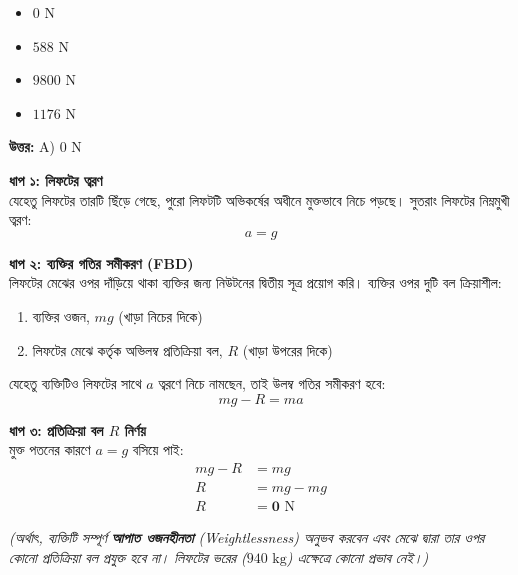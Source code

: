 \documentclass[12pt, a4paper]{article}
\begin{document}
\begin{itemize}[label={}, leftmargin=1cm, itemsep=0.5em]
    \item[\textbf{A)}]  $0\text{ N}$
    \item[\textbf{B)}] $588\text{ N}$
    \item[\textbf{C)}]  $9800\text{ N}$
    \item[\textbf{D)}] $1176\text{ N}$
\end{itemize}

\vspace{0.5em}
\begin{tcolorbox}[answerbox]
    \textbf{\color{success} উত্তর:} A)  $0\text{ N}$
\end{tcolorbox}
\vspace{1em}

\begin{tcolorbox}[solutionbox={সমাধান (Solution)}]
    \noindent
    \textbf{ধাপ ১: লিফটের ত্বরণ} \\
    যেহেতু লিফটের তারটি ছিঁড়ে গেছে, পুরো লিফটটি অভিকর্ষের অধীনে মুক্তভাবে নিচে পড়ছে। সুতরাং লিফটের নিম্নমুখী ত্বরণ:
    \[ a = g \]
    
    \vspace{0.5em}
    \noindent\textbf{ধাপ ২: ব্যক্তির গতির সমীকরণ (FBD)} \\
    লিফটের মেঝের ওপর দাঁড়িয়ে থাকা ব্যক্তির জন্য নিউটনের দ্বিতীয় সূত্র প্রয়োগ করি। ব্যক্তির ওপর দুটি বল ক্রিয়াশীল:
    \begin{enumerate}[topsep=0pt, itemsep=0pt]
        \item ব্যক্তির ওজন, $mg$ (খাড়া নিচের দিকে)
        \item লিফটের মেঝে কর্তৃক অভিলম্ব প্রতিক্রিয়া বল, $R$ (খাড়া উপরের দিকে)
    \end{enumerate}
    যেহেতু ব্যক্তিটিও লিফটের সাথে $a$ ত্বরণে নিচে নামছেন, তাই উলম্ব গতির সমীকরণ হবে:
    \[ mg - R = ma \]
    
    \vspace{0.5em}
    \noindent\textbf{ধাপ ৩: প্রতিক্রিয়া বল $R$ নির্ণয়} \\
    মুক্ত পতনের কারণে $a = g$ বসিয়ে পাই:
    \begin{align*}
        mg - R &= mg \\
        R &= mg - mg \\
        R &= \mathbf{0}\text{ N}
    \end{align*}
    
    \textit{(অর্থাৎ, ব্যক্তিটি সম্পূর্ণ \textbf{আপাত ওজনহীনতা} (Weightlessness) অনুভব করবেন এবং মেঝে দ্বারা তার ওপর কোনো প্রতিক্রিয়া বল প্রযুক্ত হবে না। লিফটের ভরের ($940\text{ kg}$) এক্ষেত্রে কোনো প্রভাব নেই।)}
\end{tcolorbox}
\end{document}
